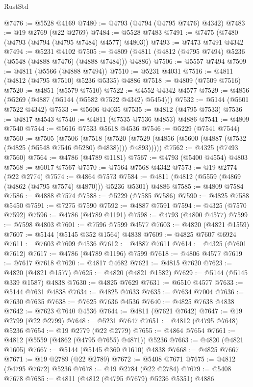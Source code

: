 \begin{lexlean}{RustStd}
\begin{coremodule}
{\begin{coremodule}
{{{{{{{{{{{{{{{{{{{{{{{{{{{{{{{{{{{{{{{{{{{{{{{{{{{{{{{{{{{{{{{{{{{{{{{{{{{{{{{{@7476 := @5528 @4169
@7480 := @4793 (@4794 (@4795 @7476) @4342)
@7483 := @19 @2769 (@22 @2769)
@7484 := @5528 @7483
@7491 := @7475 (@7480 (@4793 (@4794 (@4795 @7484) @4577) @4803))
@7493 := @7473 @7491 @4342
@7494 := @5231 @4102
@7505 := @4809 (@4811 (@4812 (@4795 @7494) @5236 (@5548 (@4888 @7476) (@4888 @7484))) @4886)
@7506 := @5557 @7494
@7509 := @4811 (@5566 (@4888 @7494))
@7510 := @5231 @4031
@7516 := @4811 (@4812 (@4795 @7510) @5236 @5335) @4886
@7518 := @4809 (@7509 @7516)
@7520 := @4851 (@5579 @7510)
@7522 := @4552 @4342 @4577
@7529 := @4856 (@5269 (@4887 (@5144 (@5582 @7522 @4342) @5454)))
@7532 := @5144 (@5601 @7522 @4342)
@7533 := @5606 @4035
@7535 := @4812 (@4795 @7533)
@7536 := @4817 @4543
@7540 := @4811 (@7535 @7536 @4853) @4886
@7541 := @4809 @7540
@7544 := @5616 @7533 @5618 @4536
@7546 := @5229 (@7541 @7544)
@7560 := @7505
    (@7506
      (@7518
        (@7520 (@7529 (@4856 (@5600 (@4887 (@7532 (@4825 (@5548 @7546 @5280) @4838)))) @4893)))))
@7562 := @4325 (@7493 @7560)
@7564 := @4786 (@4789 @1181)
@7567 := @4793 (@5400 @4554) @4803
@7568 := @6017 @7567
@7570 := @7564 @7568 @4342
@7573 := @19 @2774 (@22 @2774)
@7574 := @4864 @7573
@7584 := @4811 (@4812 (@5559 (@4869 (@4862 (@4795 @7574) @4870))) @5236 @5301) @4886
@7585 := @4809 @7584
@7586 := @4888 @7574
@7588 := @5229 (@7585 @7586)
@7590 := @4825 @7588 @5450
@7591 := @7275 @7590
@7592 := @4887 @7591
@7594 := @4325 (@7570 @7592)
@7596 := @4786 (@4789 @1191)
@7598 := @4793 (@4800 @4577)
@7599 := @7598 @4803
@7601 := @7596 @7599 @4577
@7603 := @4820 (@4821 @1559)
@7607 := @5144 (@5145 @352 @1564) @4838
@7609 := @4825 @7607 @6924
@7611 := @7603 @7609 @4536
@7612 := @4887 @7611
@7614 := @4325 (@7601 @7612)
@7617 := @4786 (@4789 @1196) @7599
@7618 := @4806 @4577
@7619 := @7617 @7618
@7620 := @4817 @4682
@7621 := @4815 @7620
@7623 := @4820 (@4821 @1577)
@7625 := @4820 (@4821 @1582)
@7629 := @5144 (@5145 @339 @1587) @4838
@7630 := @4825 @7629
@7631 := @6510 @4577
@7633 := @5144 @7631 @4838
@7634 := @4825 @7633
@7635 := @7634 @7004
@7636 := @7630 @7635
@7638 := @7625 @7636 @4536
@7640 := @4825 @7638 @4838
@7642 := @7623 @7640 @4536
@7644 := @4811 (@7621 @7642)
@7647 := @19 @2799 (@22 @2799)
@7648 := @5231 @7647
@7651 := @4812 (@4795 @7648) @5236
@7654 := @19 @2779 (@22 @2779)
@7655 := @4864 @7654
@7661 := @4812 (@5559 (@4862 (@4795 @7655) @4871)) @5236
@7663 := @4820 (@4821 @1605)
@7667 := @5144 (@5145 @360 @1610) @4838
@7668 := @4825 @7667
@7671 := @19 @2789 (@22 @2789)
@7672 := @5408 @7671
@7675 := @4812 (@4795 @7672) @5236
@7678 := @19 @2784 (@22 @2784)
@7679 := @5408 @7678
@7685 := @4811 (@4812 (@4795 @7679) @5236 @5351) @4886
}}}}}}}}}}}}}}}}}}}}}}}}}}}}}}}}}}}}}}}}}}}}}}}}}}}}}}}}}}}}}}}}}}}}}}}}}}}}}}}}
\end{coremodule}}
\end{coremodule}
\end{lexlean}
